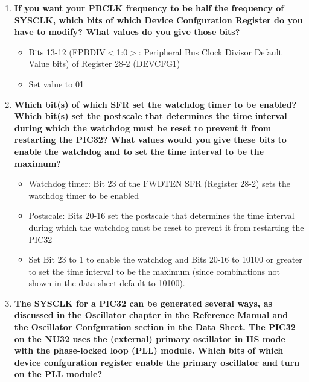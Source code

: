 \documentclass{article}
\begin{document}
\begin{enumerate}[label=\textbf{\arabic*})]
    \begin{enumerate}[label=\textbf{\alph*}.]
        \item \textbf{If you want your PBCLK frequency to be half the frequency of SYSCLK, which bits
        of which Device Confguration Register do you have to modify? What values do you
        give those bits?} \\
        
        \begin{itemize}
            \item Bits 13-12 (FPBDIV$<$1:0$>$: Peripheral Bus Clock Divisor Default Value bits) of Register 28-2 (DEVCFG1)
            \item Set value to 01
        \end{itemize} 

        \item \textbf{Which bit(s) of which SFR set the watchdog timer to be enabled? Which bit(s) set
        the postscale that determines the time interval during which the watchdog must be
        reset to prevent it from restarting the PIC32? What values would you give these bits
        to enable the watchdog and to set the time interval to be the maximum?} \\

        \begin{itemize}
            \item Watchdog timer: Bit 23 of the FWDTEN SFR (Register 28-2) sets the watchdog timer to 
            be enabled
            \item Postscale: Bits 20-16 set the postscale that determines the time interval during 
            which the watchdog must be reset to prevent it from restarting the PIC32
            \item Set Bit 23 to 1 to enable the watchdog and Bits 20-16 to 10100 or greater to set
            the time interval to be the maximum (since combinations not shown in the data sheet 
            default to 10100).
        \end{itemize}

        \item \textbf{The SYSCLK for a PIC32 can be generated several ways, as discussed in the
        Oscillator chapter in the Reference Manual and the Oscillator Confguration section
        in the Data Sheet. The PIC32 on the NU32 uses the (external) primary oscillator in
        HS mode with the phase-locked loop (PLL) module. Which bits of which device
        confguration register enable the primary oscillator and turn on the PLL module?} \\


\end{enumerate}
\end{enumerate}
\end{document}
